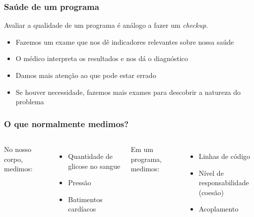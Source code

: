 \documentclass{beamer}
\begin{document}
\begin{frame}
  \frametitle{Saúde de um programa}

  Avaliar a qualidade de um programa é análogo a fazer um \textit{checkup}.
  \begin{itemize}
    \item Fazemos um exame que nos dê indicadores relevantes sobre nossa saúde
    \vspace{.5cm}
    \item O médico interpreta os resultados e nos dá o diagnóstico
    \vspace{.5cm}
    \item Damos mais atenção ao que pode estar errado
    \vspace{.5cm}
    \item Se houver necessidade, fazemos mais exames para descobrir a natureza do problema
  \end{itemize}
\end{frame}

\begin{frame}
  \frametitle{O que normalmente medimos?}

  \begin{columns}[c]
      No nosso corpo, medimos:
      \vspace{.5cm}
      \begin{itemize}
        \item Quantidade de glicose no sangue
        \vspace{.35cm}
        \item Pressão
        \vspace{.35cm}
        \item Batimentos cardíacos
      \end{itemize}
      Em um programa, medimos:
      \vspace{.5cm}
      \begin{itemize}
        \item Linhas de código
        \vspace{.35cm}
        \item Nível de responsabilidade (coesão)
        \vspace{.35cm}
        \item Acoplamento
      \end{itemize}
  \end{columns}
\end{frame}
\end{document}
